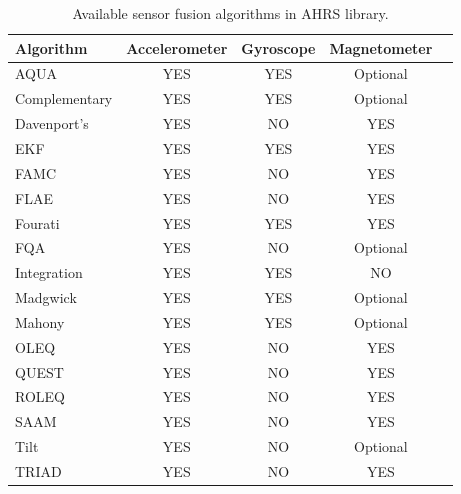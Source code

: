 \begin{table}
  \begin{center}
    \begin{tabular}[t]{lcccc}
      \hline
      Algorithm     & Accelerometer & Gyroscope & Magnetometer \\
      \hline
      AQUA          & YES           & YES       & Optional     \\
      Complementary & YES           & YES       & Optional     \\
      Davenport's   & YES           & NO        & YES          \\
      EKF           & YES           & YES       & YES          \\
      FAMC          & YES           & NO        & YES          \\
      FLAE          & YES           & NO        & YES          \\
      Fourati       & YES           & YES       & YES          \\
      FQA           & YES           & NO        & Optional     \\
      Integration   & YES           & YES       & NO           \\
      Madgwick      & YES           & YES       & Optional     \\
      Mahony        & YES           & YES       & Optional     \\
      OLEQ          & YES           & NO        & YES          \\
      QUEST         & YES           & NO        & YES          \\
      ROLEQ         & YES           & NO        & YES          \\
      SAAM          & YES           & NO        & YES          \\
      Tilt          & YES           & NO        & Optional     \\
      TRIAD         & YES           & NO        & YES          \\
      \hline
    \end{tabular}
    \caption{Available sensor fusion algorithms in AHRS library. }
    \label{tab:ahrs_algorithms}
  \end{center}
\end{table}


